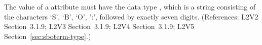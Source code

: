 The value of a  attribute must have the data type
, which is a string consisting of the characters `S', `B',
`O', ':', followed by exactly seven digits.  (References: L2V2 
Section~3.1.9; L2V3 Section~3.1.9; L2V4 Section~3.1.9; L2V5 Section~\ref{sec:sboterm-type}.)
